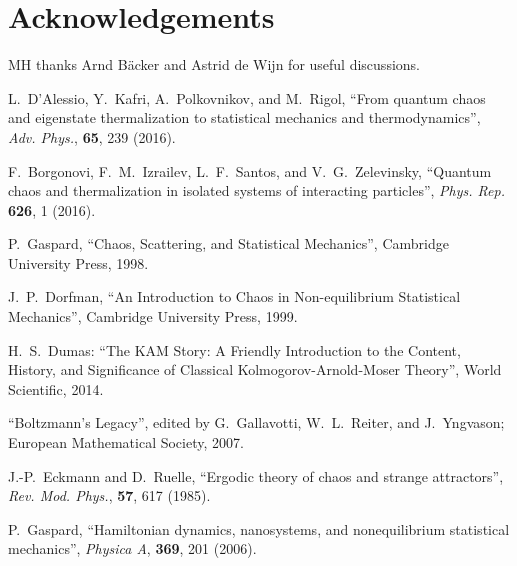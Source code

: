 \documentclass[a4paper, onecolumn]{revtex4-1}
\begin{document}
\section*{Acknowledgements}

MH thanks Arnd B\"acker and Astrid de Wijn for useful discussions.



\begin{thebibliography}{1}


L.~D'Alessio, Y.~Kafri, A.~Polkovnikov, and M.~Rigol, 
``From quantum chaos and eigenstate thermalization to statistical mechanics and thermodynamics'', 
{\em Adv.
  Phys.}, {\bf 65}, 239 (2016).

F.~Borgonovi, F.~M.~Izrailev, L.~F.~Santos, and V.~G.~Zelevinsky,
``Quantum chaos and thermalization in isolated systems of interacting particles'', 
  {\em Phys. Rep.} {\bf 626}, 1 (2016).


P.~Gaspard, ``Chaos, Scattering, and Statistical Mechanics'', Cambridge University Press, 1998.

 J.~P.~Dorfman, ``An Introduction to Chaos in Non-equilibrium Statistical
  Mechanics'', Cambridge University Press, 1999.

 H.~S.~Dumas: ``The KAM Story: A Friendly Introduction to the Content,
History, and Significance of Classical Kolmogorov-Arnold-Moser Theory'', World Scientific, 2014. 

 ``Boltzmann's Legacy'', edited by G.~Gallavotti, W.~L.~Reiter, and
  J.~Yngvason; European Mathematical Society, 2007.

  J.-P.~Eckmann and D.~Ruelle,
  ``Ergodic theory of chaos and strange attractors'', 
  \emph{Rev. Mod. Phys.}, {\bf 57}, 617  (1985).

P.~Gaspard, 
``Hamiltonian dynamics, nanosystems, and nonequilibrium statistical mechanics'', 
{\em Physica A}, {\bf 369}, 201 (2006). 



\end{thebibliography}
\end{document}
